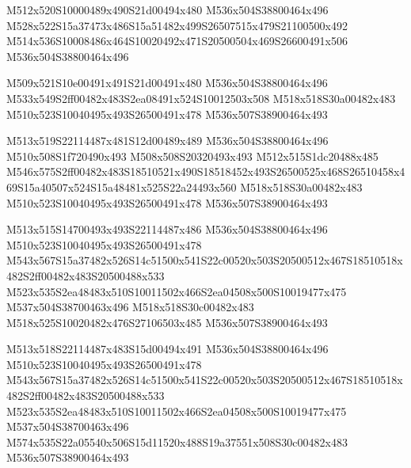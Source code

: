 \documentclass{article}
\begin{document}
\begin{multicols}{5}
\begin{center}

M512x520S10000489x490S21d00494x480 %
M536x504S38800464x496 %
M528x522S15a37473x486S15a51482x499S26507515x479S21100500x492 %
M514x536S10008486x464S10020492x471S20500504x469S26600491x506 %
M536x504S38800464x496 %
\vfil
\columnbreak

M509x521S10e00491x491S21d00491x480 %
M536x504S38800464x496 %
M533x549S2ff00482x483S2ea08491x524S10012503x508 %
M518x518S30a00482x483 %
M510x523S10040495x493S26500491x478 %
M536x507S38900464x493 %
\vfil
\columnbreak

M513x519S22114487x481S12d00489x489 %
M536x504S38800464x496 %
M510x508S1f720490x493 %
M508x508S20320493x493 %
M512x515S1dc20488x485 %
M546x575S2ff00482x483S18510521x490S18518452x493S26500525x468S26510458x469S15a40507x524S15a48481x525S22a24493x560 %
M518x518S30a00482x483 %
M510x523S10040495x493S26500491x478 %
M536x507S38900464x493 %
\vfil
\columnbreak

M513x515S14700493x493S22114487x486 %
M536x504S38800464x496 %
M510x523S10040495x493S26500491x478 %
M543x567S15a37482x526S14c51500x541S22c00520x503S20500512x467S18510518x482S2ff00482x483S20500488x533 %
M523x535S2ea48483x510S10011502x466S2ea04508x500S10019477x475 %
M537x504S38700463x496 %
M518x518S30c00482x483 %
M518x525S10020482x476S27106503x485 %
M536x507S38900464x493 %
\vfil
\columnbreak

M513x518S22114487x483S15d00494x491 %
M536x504S38800464x496 %
M510x523S10040495x493S26500491x478 %
M543x567S15a37482x526S14c51500x541S22c00520x503S20500512x467S18510518x482S2ff00482x483S20500488x533 %
M523x535S2ea48483x510S10011502x466S2ea04508x500S10019477x475 %
M537x504S38700463x496 %
M574x535S22a05540x506S15d11520x488S19a37551x508S30c00482x483 %
M536x507S38900464x493 %
\vfil

\end{center}
\end{multicols}
\end{document}
